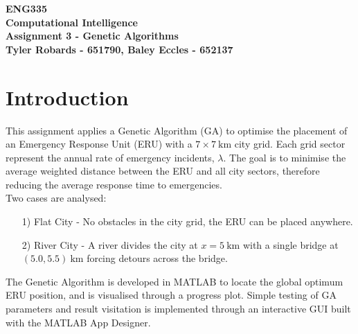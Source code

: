 \documentclass[12pt,a4paper]{article}
\begin{document}
\begin{center}
\textbf{\LARGE ENG335\\[6pt]
Computational Intelligence}\\[10pt]
\textbf{\large Assignment 3 - Genetic Algorithms\\[4pt]
Tyler Robards - 651790, Baley Eccles - 652137}\\
\end{center}

\tableofcontents
\newpage

\section{Introduction}
This assignment applies a Genetic Algorithm (GA) to optimise the placement of an Emergency Response Unit (ERU) with a $7\times 7\:\text{km}$ city grid. Each grid sector represent the annual rate of emergency incidents, $\lambda$. The goal is to minimise the average weighted distance between the ERU and all city sectors, therefore reducing the average response time to emergencies.\\
Two cases are analysed:
\begin{enumerate}
	\item [1)] Flat City - No obstacles in the city grid, the ERU can be placed anywhere.
		\hfill
	\item [2)] River City - A river divides the city at $x=5\:\text{km}$ with a single bridge at $(5.0,5.5)\:\text{km}$ forcing detours across the bridge.
		\hfill	
\end{enumerate}
The Genetic Algorithm is developed in MATLAB to locate the global optimum ERU position, and is visualised through a progress plot. Simple testing of GA parameters and result visitation is implemented through an interactive GUI built with the MATLAB App Designer.
\end{document}
